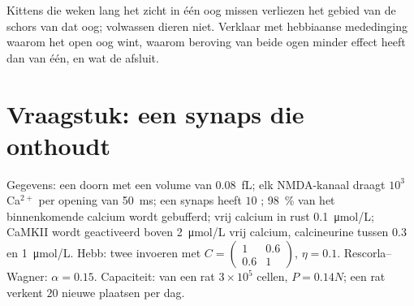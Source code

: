 \begin{exercise}[$\star\star\star$]\label{exo:b3:learning-memory:12}
Kittens die weken lang het zicht in één oog missen verliezen het gebied
van de schors van dat oog; volwassen dieren niet. Verklaar met
hebbiaanse mededinging waarom het open oog wint, waarom beroving van
beide ogen minder effect heeft dan van één, en wat de 
afsluit.
\end{exercise}

\section{Vraagstuk: een synaps die onthoudt}

\begin{problem}
\label{pb:b3:learning-memory:1}
Gegevens: een doorn met een volume van \qty{0.08}{fL}; elk NMDA-kanaal
draagt $10^{3}$ Ca$^{2+}$ per opening van \qty{50}{ms}; een synaps
heeft $10$ ; \qty{98}{\%} van het binnenkomende calcium
wordt gebufferd; vrij calcium in rust \qty{0.1}{\micro mol/L}; CaMKII
wordt geactiveerd boven \qty{2}{\micro mol/L} vrij calcium,
calcineurine tussen $0.3$ en
\qty{1}{\micro mol/L}. Hebb: twee invoeren met $C = \begin{pmatrix}1 &
0.6\\ 0.6 & 1\end{pmatrix}$, $\eta = 0.1$. Rescorla--Wagner: $\alpha =
0.15$. Capaciteit:  van een rat $3\times 10^{5}$ cellen,
$P = 0.14N$; een rat verkent $20$ nieuwe plaatsen per dag.


\end{problem}
